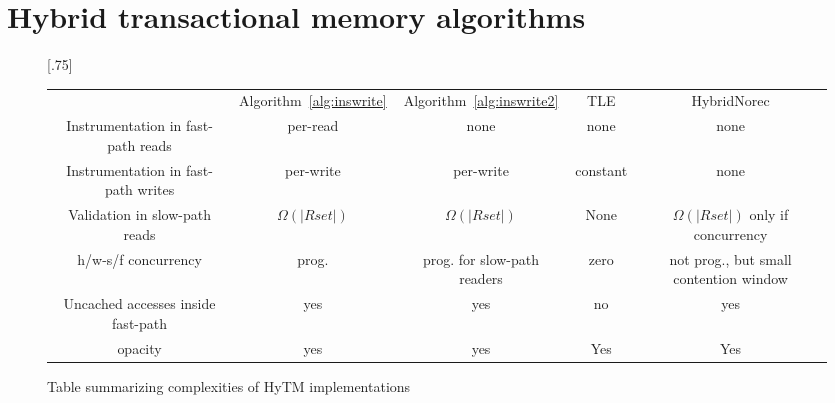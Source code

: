 \section{Hybrid transactional memory algorithms}\label{sec:hytmalgos}
%
\begin{figure*}[!t]
      
     \scalebox{.75}[.75]{
     \begin{tabularx}{\textwidth}{c|c|c|c|c}
	~~~~~ & Algorithm~\ref{alg:inswrite} & Algorithm~\ref{alg:inswrite2} & TLE & HybridNorec\\ 
	Instrumentation in fast-path reads & per-read & none & none & none \\ 
	Instrumentation in fast-path writes & per-write & per-write & constant & none \\ 
	Validation in slow-path reads & $\Omega(|Rset|)$ & $\Omega(|Rset|)$ & None & $\Omega(|Rset|)$ only if concurrency \\ 
	h/w-s/f concurrency & prog. & prog. for slow-path readers & zero & not prog., but small contention window \\ 
	Uncached accesses inside fast-path & yes & yes & no & yes \\ 
	opacity & yes & yes & Yes & Yes 
   \end{tabularx}
\caption{Table summarizing complexities of HyTM implementations}\label{fig:main}    
}
\end{figure*}
%

%
%